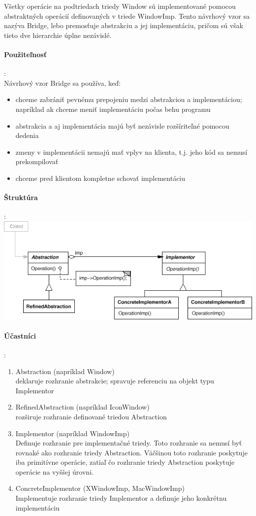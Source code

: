 		Všetky operácie na podtriedach triedy Window sú implementované pomocou abstraktných operácií definovaných v triede WindowImp. Tento návrhový vzor sa nazýva Bridge, lebo premosťuje abstrakciu a jej implementáciu, pričom sú však tieto dve hierarchie úplne nezávislé.

	\paragraph{Použiteľnosť}:\\
		Návrhový vzor Bridge sa používa, keď:
		\begin{itemize}
			\item chceme zabrániť pevnému prepojeniu medzi abstrakciou a implementáciou; napríklad ak chceme meniť implementáciu počas behu programu
			\item abstrakcia a aj implementácia majú byť nezávisle rozšíriteľné pomocou dedenia
			\item zmeny v implementácii nemajú mať vplyv na klienta, t.j. jeho kód sa nemusí prekompilovať
			\item chceme pred klientom kompletne schovať implementáciu
		\end{itemize}
	\paragraph{Štruktúra}:\\

		\includegraphics[width=.9\textwidth]{images/bridge3}


	\paragraph{Účastníci}:
		\begin{enumerate}
			\item Abstraction (napríklad Window)\\
				deklaruje rozhranie abstrakcie; spravuje referenciu na objekt typu Implementor
			\item RefinedAbstraction (napríklad IconWindow)\\
				rozširuje rozhranie definované triedou Abstraction
			\item Implementor (napríklad WindowImp)\\
				Definuje rozhranie pre implementačné triedy. Toto rozhranie sa nemusí byť rovnaké ako rozhranie triedy Abstraction. Väčšinou toto rozhranie poskytuje iba primitívne operácie, zatiaľ čo rozhranie triedy Abstraction poskytuje operácie na vyššej úrovni.
			\item ConcreteImplementor (XWindowImp, MacWindowImp)\\
				Implementuje rozhranie triedy Implementor a definuje jeho konkrétnu implementáciu
		\end{enumerate}
